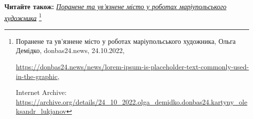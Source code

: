  
 
 
 
 

\textbf{Читайте також:} \href{https://archive.org/details/24_10_2022.olga_demidko.donbas24.kartyny_oleksandr_lukjanov}{\emph{Поранене та ув'язнене місто у роботах маріупольського художника}}%
\footnote{Поранене та ув'язнене місто у роботах маріупольського художника, Ольга Демідко, donbas24.news, 24.10.2022, \par%
\url{https://donbas24.news/news/lorem-ipsum-is-placeholder-text-commonly-used-in-the-graphic}, \par%
Internet Archive: \url{https://archive.org/details/24_10_2022.olga_demidko.donbas24.kartyny_oleksandr_lukjanov}%
}
